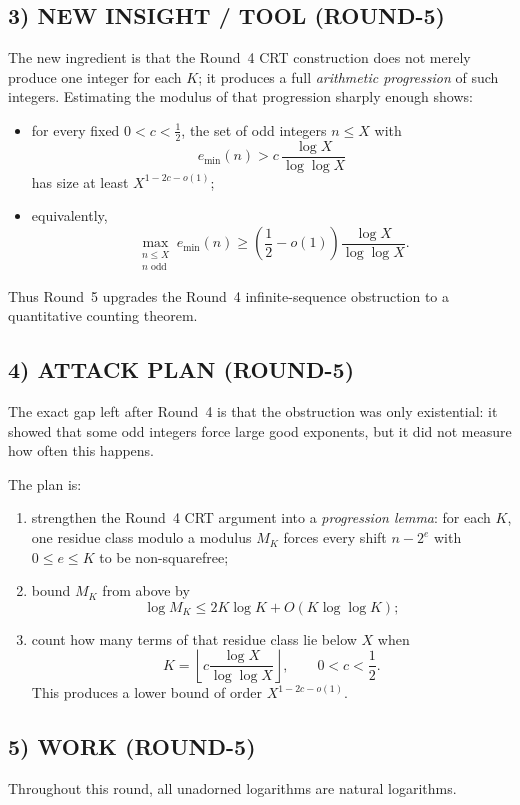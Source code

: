 \subsection{3) NEW INSIGHT / TOOL (ROUND-5)}
The new ingredient is that the Round~4 CRT construction does not merely produce one integer for each $K$; it produces a full \emph{arithmetic progression} of such integers. Estimating the modulus of that progression sharply enough shows:
\begin{itemize}
\item for every fixed $0<c<\tfrac12$, the set of odd integers $n\le X$ with
\[
 e_{\min}(n)>c\,\frac{\log X}{\log\log X}
\]
has size at least $X^{1-2c-o(1)}$;
\item equivalently,
\[
 \max_{\substack{n\le X\\ n\text{ odd}}} e_{\min}(n)\ge \left(\frac12-o(1)\right)\frac{\log X}{\log\log X}.
\]
\end{itemize}
Thus Round~5 upgrades the Round~4 infinite-sequence obstruction to a quantitative counting theorem.

\subsection{4) ATTACK PLAN (ROUND-5)}
The exact gap left after Round~4 is that the obstruction was only existential: it showed that some odd integers force large good exponents, but it did not measure how often this happens.

The plan is:
\begin{enumerate}
\item strengthen the Round~4 CRT argument into a \emph{progression lemma}: for each $K$, one residue class modulo a modulus $M_K$ forces every shift $n-2^e$ with $0\le e\le K$ to be non-squarefree;
\item bound $M_K$ from above by
\[
 \log M_K\le 2K\log K+O(K\log\log K);
\]
\item count how many terms of that residue class lie below $X$ when
\[
 K=\left\lfloor c\frac{\log X}{\log\log X}\right\rfloor,
\qquad 0<c<\frac12.
\]
This produces a lower bound of order $X^{1-2c-o(1)}$.
\end{enumerate}

\subsection{5) WORK (ROUND-5)}
Throughout this round, all unadorned logarithms are natural logarithms.

